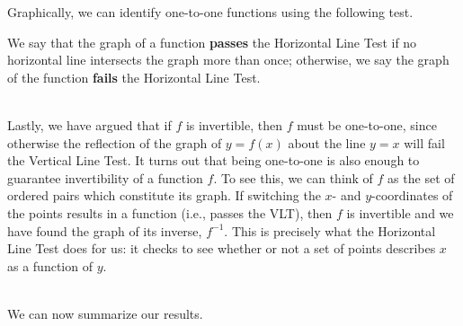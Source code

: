 \documentclass[12pt]{article}
\theoremstyle{definition}
\begin{document}
\begin{center}
\end{center}

Graphically, we can identify one-to-one functions using the following test.

\begin{center}
\end{center}

We say that the graph of a function {\bf passes} the Horizontal Line Test  if no horizontal line intersects the graph more than once; otherwise, we say the graph of the function {\bf fails} the Horizontal Line Test.\\
\ \par
Lastly, we have argued that if $f$ is invertible, then $f$ must be one-to-one, since otherwise the reflection of the graph of $y = f(x)$ about the line $y = x$ will fail the Vertical Line Test.  It turns out that being one-to-one is also enough to guarantee invertibility of a function $f$.  To see this, we can think of $f$ as the set of ordered pairs which constitute its graph.  If switching the $x$- and $y$-coordinates of the points results in a function (i.e., passes the VLT), then $f$ is invertible and we have found the graph of its inverse, $f^{-1}$. This is precisely what the Horizontal Line Test does for us: it checks to see whether or not a set of points describes $x$ as a function of $y$.\\
\ \par
We can now summarize our results.
\end{document}
